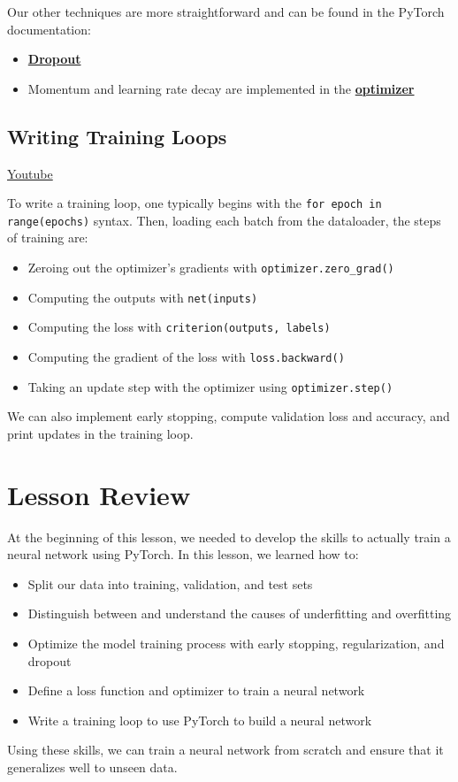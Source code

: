 Our other techniques are more straightforward and can be found in the PyTorch documentation:

\begin{itemize}
    \item \href{https://pytorch.org/docs/stable/generated/torch.nn.Dropout.html}{\textbf{Dropout}}
    \item Momentum and learning rate decay are implemented in the \href{https://pytorch.org/docs/stable/optim.html}{\textbf{optimizer}}
\end{itemize}

\subsection{Writing Training Loops}
\href{https://www.youtube.com/watch?v=Ek3_IL-kt6Y&ab_channel=Udacity}{Youtube} 

To write a training loop, one typically begins with the \verb|for epoch in range(epochs)| syntax. Then, loading each batch from the dataloader, the steps of training are:

\begin{itemize}
    \item Zeroing out the optimizer's gradients with \verb|optimizer.zero_grad()|
    \item Computing the outputs with \verb|net(inputs)|
    \item Computing the loss with \verb|criterion(outputs, labels)|
    \item Computing the gradient of the loss with \verb|loss.backward()|
    \item Taking an update step with the optimizer using \verb|optimizer.step()|
\end{itemize}
We can also implement early stopping, compute validation loss and accuracy, and print updates in the training loop.

\section{Lesson Review}
At the beginning of this lesson, we needed to develop the skills to actually train a neural network using PyTorch. In this lesson, we learned how to:

\begin{itemize}
    \item Split our data into training, validation, and test sets
    \item Distinguish between and understand the causes of underfitting and overfitting
    \item Optimize the model training process with early stopping, regularization, and dropout
    \item Define a loss function and optimizer to train a neural network
    \item Write a training loop to use PyTorch to build a neural network
\end{itemize}
Using these skills, we can train a neural network from scratch and ensure that it generalizes well to unseen data.


